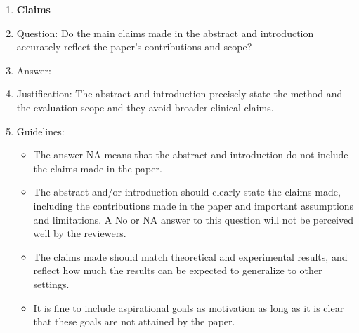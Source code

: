 \documentclass{article}
\begin{document}
\begin{enumerate}

\item {\bf Claims}
    \item[] Question: Do the main claims made in the abstract and introduction accurately reflect the paper's contributions and scope?
    \item[] Answer: \answerYes{}
    \item[] Justification: The abstract and introduction precisely state the method and the evaluation scope and they avoid broader clinical claims.
    \item[] Guidelines:
    \begin{itemize}
        \item The answer NA means that the abstract and introduction do not include the claims made in the paper.
        \item The abstract and/or introduction should clearly state the claims made, including the contributions made in the paper and important assumptions and limitations. A No or NA answer to this question will not be perceived well by the reviewers. 
        \item The claims made should match theoretical and experimental results, and reflect how much the results can be expected to generalize to other settings. 
        \item It is fine to include aspirational goals as motivation as long as it is clear that these goals are not attained by the paper. 
    \end{itemize}


\end{enumerate}
\end{document}
